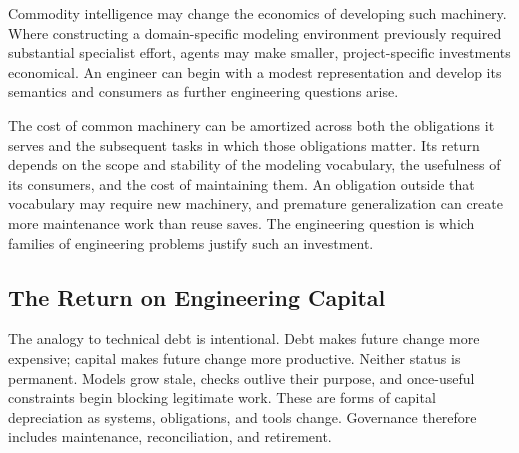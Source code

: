 Commodity intelligence may change the economics of developing such machinery. Where constructing a domain-specific modeling environment previously required substantial specialist effort, agents may make smaller, project-specific investments economical. An engineer can begin with a modest representation and develop its semantics and consumers as further engineering questions arise.

The cost of common machinery can be amortized across both the obligations it serves and the subsequent tasks in which those obligations matter. Its return depends on the scope and stability of the modeling vocabulary, the usefulness of its consumers, and the cost of maintaining them. An obligation outside that vocabulary may require new machinery, and premature generalization can create more maintenance work than reuse saves. The engineering question is which families of engineering problems justify such an investment.

\subsection{The Return on Engineering Capital}\label{heading:the-return-on-engineering-capital}


The analogy to technical debt is intentional. Debt makes future change more expensive; capital makes future change more productive. Neither status is permanent. Models grow stale, checks outlive their purpose, and once-useful constraints begin blocking legitimate work. These are forms of capital depreciation as systems, obligations, and tools change. Governance therefore includes maintenance, reconciliation, and retirement.


